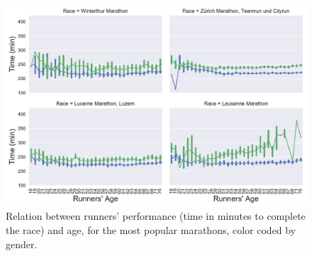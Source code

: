 \documentclass[fleqn,10pt]{wlscirep}
\begin{document}
			
			\begin{figure}[h]	
		
				\centering
				
				\includegraphics[scale=0.6]{../data_analysis/plots_for_paper/performance_VS_age_marathon.pdf}
				
				
				\caption{Relation between runners' performance (time in minutes to complete the race) and age, for the most popular marathons, color coded by gender.}
				
				\label{performance_VS_age_marathon}
		
			\end{figure}								
		
\end{document}
